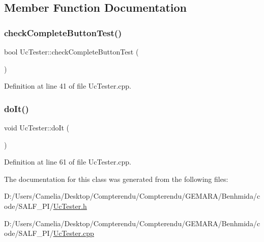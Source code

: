 \subsection{Member Function Documentation}
\mbox{\label{class_uc_tester_a00d49661f31d159e2873a179e6f60eb8}} 
\subsubsection{\texorpdfstring{check\+Complete\+Button\+Test()}{checkCompleteButtonTest()}}
{\footnotesize\ttfamily bool Uc\+Tester\+::check\+Complete\+Button\+Test (\begin{DoxyParamCaption}{ }\end{DoxyParamCaption})}



Definition at line 41 of file Uc\+Tester.\+cpp.

\mbox{\label{class_uc_tester_a69f5d786369de873a3ec6cb367b990cb}} 
\subsubsection{\texorpdfstring{do\+It()}{doIt()}}
{\footnotesize\ttfamily void Uc\+Tester\+::do\+It (\begin{DoxyParamCaption}{ }\end{DoxyParamCaption})}



Definition at line 61 of file Uc\+Tester.\+cpp.



The documentation for this class was generated from the following files\+:\begin{DoxyCompactItemize}
\item 
D\+:/\+Users/\+Camelia/\+Desktop/\+Compterendu/\+Compterendu/\+G\+E\+M\+A\+R\+A/\+Benhmida/code/\+S\+A\+L\+F\+\_\+\+P\+I/\hyperlink{_uc_tester_8h}{Uc\+Tester.\+h}\item 
D\+:/\+Users/\+Camelia/\+Desktop/\+Compterendu/\+Compterendu/\+G\+E\+M\+A\+R\+A/\+Benhmida/code/\+S\+A\+L\+F\+\_\+\+P\+I/\hyperlink{_uc_tester_8cpp}{Uc\+Tester.\+cpp}\end{DoxyCompactItemize}
